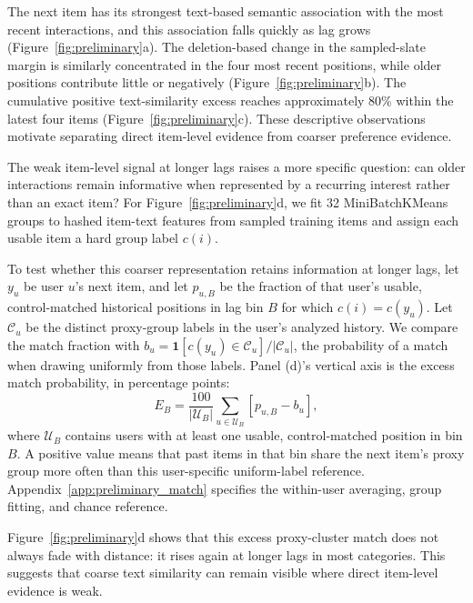 ﻿\documentclass[sigconf,anonymous,review]{acmart}
\begin{document}
The next item has its strongest text-based semantic association with the most recent interactions, and this association falls quickly as lag grows (Figure~\ref{fig:preliminary}a). The deletion-based change in the sampled-slate margin is similarly concentrated in the four most recent positions, while older positions contribute little or negatively (Figure~\ref{fig:preliminary}b). The cumulative positive text-similarity excess reaches approximately 80\% within the latest four items (Figure~\ref{fig:preliminary}c). These descriptive observations motivate separating direct item-level evidence from coarser preference evidence.

The weak item-level signal at longer lags raises a more specific question: can older interactions remain informative when represented by a recurring interest rather than an exact item? For Figure~\ref{fig:preliminary}d, we fit 32 MiniBatchKMeans groups to hashed item-text features from sampled training items and assign each usable item a hard group label $c(i)$. 

To test whether this coarser representation retains information at longer lags, let $y_u$ be user $u$'s next item, and let $p_{u,B}$ be the fraction of that user's usable, control-matched historical positions in lag bin $B$ for which $c(i)=c(y_u)$. Let $\mathcal C_u$ be the distinct proxy-group labels in the user's analyzed history. We compare the match fraction with $b_u=\mathbf{1}[c(y_u)\in\mathcal C_u]/|\mathcal C_u|$, the probability of a match when drawing uniformly from those labels. Panel (d)'s vertical axis is the excess match probability, in percentage points:
\begin{equation}
 E_B=\frac{100}{|\mathcal U_B|}\sum_{u\in\mathcal U_B}
 \left[p_{u,B}-b_u\right],
\end{equation}
where $\mathcal U_B$ contains users with at least one usable, control-matched position in bin $B$. A positive value means that past items in that bin share the next item's proxy group more often than this user-specific uniform-label reference. Appendix~\ref{app:preliminary_match} specifies the within-user averaging, group fitting, and chance reference.

Figure~\ref{fig:preliminary}d shows that this excess proxy-cluster match does not always fade with distance: it rises again at longer lags in most categories. This suggests that coarse text similarity can remain visible where direct item-level evidence is weak.
\end{document}
